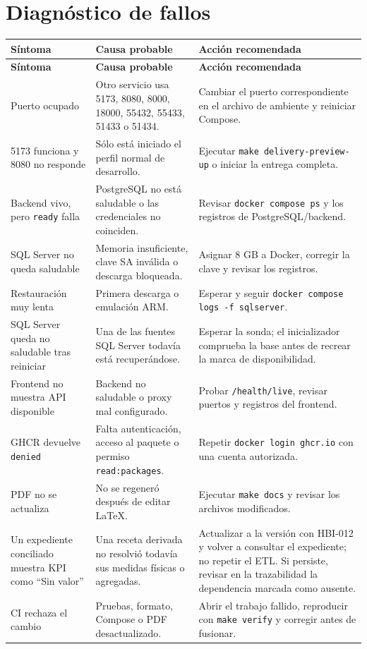 \documentclass[11pt,letterpaper]{article}
\newcommand{\file}[1]{\texttt{#1}}
\begin{document}
\section{Diagnóstico de fallos}

\begin{longtable}{@{}p{}p{}p{}@{}}
  \toprule
  \textbf{Síntoma} & \textbf{Causa probable} & \textbf{Acción recomendada} \\
  \midrule
  \endfirsthead
  \toprule
  \textbf{Síntoma} & \textbf{Causa probable} & \textbf{Acción recomendada} \\
  \midrule
  \endhead
  Puerto ocupado & Otro servicio usa 5173, 8080, 8000, 18000, 55432, 55433, 51433 o 51434. & Cambiar el puerto correspondiente en el archivo de ambiente y reiniciar Compose. \\
  5173 funciona y 8080 no responde & Sólo está iniciado el perfil normal de desarrollo. & Ejecutar \file{make delivery-preview-up} o iniciar la entrega completa. \\
  Backend vivo, pero \file{ready} falla & PostgreSQL no está saludable o las credenciales no coinciden. & Revisar \file{docker compose ps} y los registros de PostgreSQL/backend. \\
  SQL Server no queda saludable & Memoria insuficiente, clave SA inválida o descarga bloqueada. & Asignar 8 GB a Docker, corregir la clave y revisar los registros. \\
  Restauración muy lenta & Primera descarga o emulación ARM. & Esperar y seguir \file{docker compose logs -f sqlserver}. \\
  SQL Server queda no saludable tras reiniciar & Una de las fuentes SQL Server todavía está recuperándose. & Esperar la sonda; el inicializador comprueba la base antes de recrear la marca de disponibilidad. \\
  Frontend no muestra API disponible & Backend no saludable o proxy mal configurado. & Probar \file{/health/live}, revisar puertos y registros del frontend. \\
  GHCR devuelve \file{denied} & Falta autenticación, acceso al paquete o permiso \file{read:packages}. & Repetir \file{docker login ghcr.io} con una cuenta autorizada. \\
  PDF no se actualiza & No se regeneró después de editar LaTeX. & Ejecutar \file{make docs} y revisar los archivos modificados. \\
  Un expediente conciliado muestra KPI como ``Sin valor'' & Una receta derivada no resolvió todavía sus medidas físicas o agregadas. & Actualizar a la versión con HBI-012 y volver a consultar el expediente; no repetir el ETL. Si persiste, revisar en la trazabilidad la dependencia marcada como ausente. \\
  CI rechaza el cambio & Pruebas, formato, Compose o PDF desactualizado. & Abrir el trabajo fallido, reproducir con \file{make verify} y corregir antes de fusionar. \\
  \bottomrule
\end{longtable}
\end{document}
